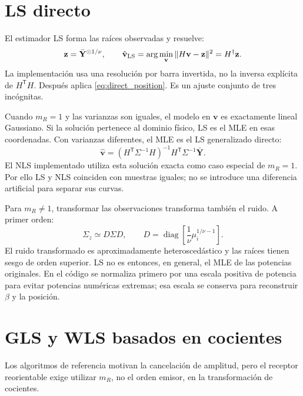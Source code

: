 \documentclass[11pt,a4paper]{article}
\begin{document}
\section{LS directo}
El estimador LS forma las raíces observadas y resuelve:
\begin{equation}
 \mathbf z=\bar{\mathbf Y}^{\odot1/\nu},\qquad
 \hat{\mathbf v}_{\rm LS}=\arg\min_{\mathbf v}\|H\mathbf v-\mathbf z\|^2
 =H^\dagger\mathbf z.
\end{equation}
La implementación usa una resolución por barra invertida, no la inversa explícita de $H^{\mathsf T}H$. Después aplica \eqref{eq:direct_position}. Es un ajuste conjunto de tres incógnitas.

Cuando $m_R=1$ y las varianzas son iguales, el modelo en $\mathbf v$ es exactamente lineal Gaussiano. Si la solución pertenece al dominio físico, LS es el MLE en esas coordenadas. Con varianzas diferentes, el MLE es el LS generalizado directo:
\begin{equation}
 \hat{\mathbf v}=(H^{\mathsf T}\Sigma^{-1}H)^{-1}H^{\mathsf T}\Sigma^{-1}\bar{\mathbf Y}.
\label{eq:direct_weighted}
\end{equation}
El NLS implementado utiliza esta solución exacta como caso especial de $m_R=1$. Por ello LS y NLS coinciden con muestras iguales; no se introduce una diferencia artificial para separar sus curvas.

Para $m_R\ne1$, transformar las observaciones transforma también el ruido. A primer orden:
\begin{equation}
 \Sigma_z\simeq D\Sigma D,\qquad
 D=\operatorname{diag}\left[\frac1\nu\mu_i^{1/\nu-1}\right].
\end{equation}
El ruido transformado es aproximadamente heteroscedástico y las raíces tienen sesgo de orden superior. LS no es entonces, en general, el MLE de las potencias originales. En el código se normaliza primero por una escala positiva de potencia para evitar potencias numéricas extremas; esa escala se conserva para reconstruir $\beta$ y la posición.

\section{GLS y WLS basados en cocientes}
Los algoritmos de referencia \cite{tcom,broadcast} motivan la cancelación de amplitud, pero el receptor reorientable exige utilizar $m_R$, no el orden emisor, en la transformación de cocientes.
\end{document}
